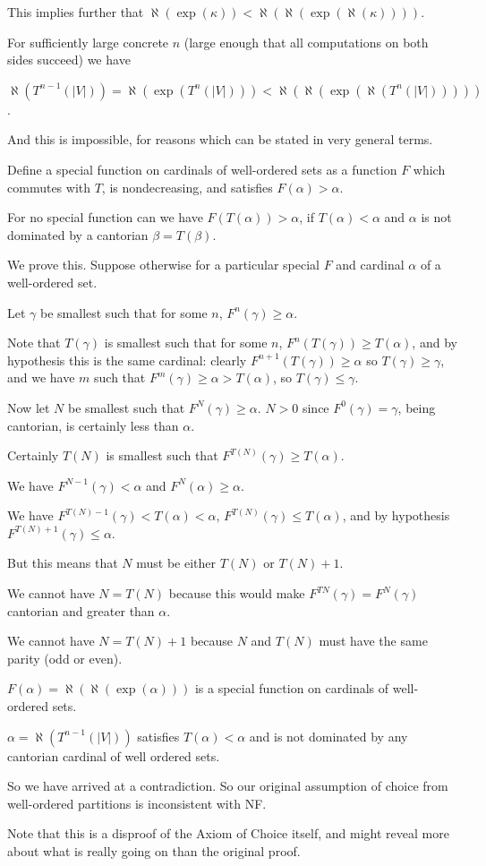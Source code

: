 \documentclass[12pt]{article}
\begin{document}
This implies further that $\aleph(\exp(\kappa)) < \aleph(\aleph(\exp(\aleph(\kappa))))$.  

For sufficiently large concrete $n$ (large enough that all computations on both sides succeed) we have 

$\aleph(T^{n-1}(|V|))=\aleph(\exp(T^n(|V|))) < \aleph(\aleph(\exp(\aleph(T^n(|V|)))))$. 

And this is impossible, for reasons which can be stated in very general terms.

Define a special function on cardinals of well-ordered sets as a function $F$ which commutes with $T$, is nondecreasing, and satisfies $F(\alpha)>\alpha$.

For no special function can we have $F(T(\alpha)) > \alpha$, if $T(\alpha)<\alpha$ and $\alpha$ is not dominated by a cantorian $\beta=T(\beta)$.

We prove this.  Suppose otherwise for a particular special $F$ and cardinal $\alpha$ of a well-ordered set.

Let $\gamma$ be smallest such that for some $n$, $F^n(\gamma) \geq \alpha$.

Note that $T(\gamma)$ is smallest such that for some $n$, $F^n(T(\gamma)) \geq T(\alpha)$, and by hypothesis this is the same cardinal:
clearly $F^{n+1}(T(\gamma)) \geq \alpha$ so $T(\gamma)\geq \gamma$, and we have $m$ such that $F^m(\gamma) \geq \alpha >T(\alpha)$, so $T(\gamma) \leq \gamma$.

Now let $N$ be smallest such that $F^N(\gamma)\geq \alpha$.  $N >0$ since $F^0(\gamma) = \gamma$, being cantorian, is certainly less than $\alpha$.

Certainly $T(N)$ is smallest such that $F^{T(N)}(\gamma) \geq T(\alpha)$.

We have $F^{N-1}(\gamma)<\alpha$ and $F^N(\alpha) \geq \alpha$.

We have $F^{T(N)-1}(\gamma)<T(\alpha)<\alpha$, $F^{T(N)}(\gamma) \leq T(\alpha)$, and by hypothesis $F^{T(N)+1}(\gamma) \leq \alpha$.

But this means that $N$ must be either $T(N)$ or $T(N)+1$.

We cannot have $N=T(N)$ because this would make $F^{TN}(\gamma) = F^N(\gamma)$ cantorian and greater than $\alpha$.

We cannot have $N=T(N)+1$ because $N$ and $T(N)$ must have the same parity (odd or even).

$F(\alpha) = \aleph(\aleph(\exp(\alpha)))$ is a special function on cardinals of well-ordered sets.

$\alpha = \aleph(T^{n-1}(|V|))$ satisfies $T(\alpha)<\alpha$ and is not dominated by any cantorian cardinal of well ordered sets.

So we have arrived at a contradiction.  So our original assumption of choice from well-ordered partitions is inconsistent with NF.

Note that this is a disproof of the Axiom of Choice itself, and might reveal more about what is really going on than the original proof.
\end{document}
